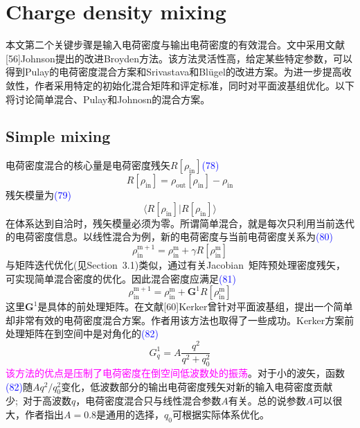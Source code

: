 \documentclass[14pt]{article}      %
\begin{document}
\section{Charge density mixing}
本文第二个关键步骤是输入电荷密度与输出电荷密度的有效混合。文中采用文献[56]\textrm{Johnson}提出的改进\textrm{Broyden}方法。该方法灵活性高，给定某些特定参数，可以得到\textrm{Pulay}的电荷密度混合方案和\textrm{Srivastava}和\textrm{Bl\"ugel}的改进方案。为进一步提高收敛性，作者采用特定的初始化混合矩阵和评定标准，同时对平面波基组优化。以下将讨论简单混合、\textrm{Pulay}和\textrm{Johnosn}的混合方案。
\subsection{Simple mixing}
电荷密度混合的核心量是电荷密度残矢$R[\rho_{\mathrm{in}}]$\textcolor{blue}{(78)}
\begin{displaymath}
	R[\rho_{\mathrm{in}}]=\rho_{\mathrm{out}}[\rho_{\mathrm{in}}]-\rho_{\mathrm{in}}
\end{displaymath}
残矢模量为\textcolor{blue}{(79)}
\begin{displaymath}
	\langle R[\rho_{\mathrm{in}}]|R[\rho_{\mathrm{in}}]\rangle
\end{displaymath}
在体系达到自洽时，残矢模量必须为零。所谓简单混合，就是每次只利用当前迭代的电荷密度信息。以线性混合为例，新的电荷密度与当前电荷密度关系为\textcolor{blue}{(80)}
\begin{displaymath}
	\rho_{\mathrm{in}}^{\mathrm{m+1}}=\rho_{\mathrm{in}}^{\mathrm{m}}+\gamma R[\rho_{\mathrm{in}}^{\mathrm{m}}]
\end{displaymath}
与矩阵迭代优化(见\textrm{Section~3.1})类似，通过有关\textrm{Jacobian~}矩阵预处理密度残矢，可实现简单混合密度的优化。因此混合密度应满足\textcolor{blue}{(81)}
\begin{displaymath}
	\rho_{\mathrm{in}}^{\mathrm{m+1}}=\rho_{\mathrm{in}}^{\mathrm{m}}+\mathbf{G}^1R[\rho_{\mathrm{in}}^{\mathrm{m}}]
\end{displaymath}
这里$\mathbf{G}^1$是具体的前处理矩阵。在文献[60]\textrm{Kerker}曾针对平面波基组，提出一个简单却非常有效的电荷密度混合方案。作者用该方法也取得了一些成功。\textrm{Kerker}方案前处理矩阵在到空间中是对角化的\textcolor{blue}{(82)}
\begin{displaymath}
	G_q^1=A\dfrac{q^2}{q^2+q_0^2}
\end{displaymath}
\textcolor{magenta}{该方法的优点是压制了电荷密度在倒空间低波数处的振荡}。对于小的波矢，函数\textcolor{blue}{(82)}随$Aq^2/q_0^2$变化，低波数部分的输出电荷密度残矢对新的输入电荷密度贡献少;~对于高波数$q$，电荷密度混合只与线性混合参数$A$有关。总的说参数$A$可以很大，作者指出$A=0.8$是通用的选择，$q_0$可根据实际体系优化。
\end{document}

